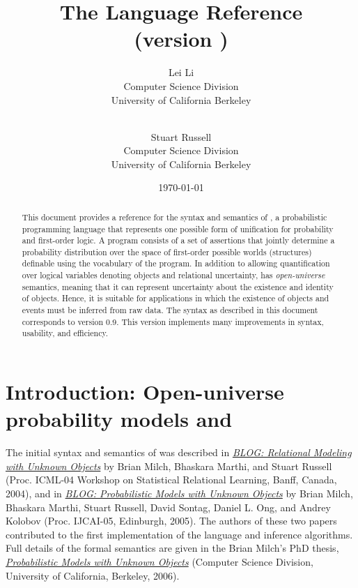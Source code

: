 \documentclass[12pt]{article}
\title{The \bl Language Reference  \\
{\large (\bl version \blogversion)}
}
\author{Lei Li\\
              Computer Science Division\\
              University of California Berkeley\\
               \email{leili@cs.berkeley.edu}\\
\and
               Stuart Russell\\
              Computer Science Division\\
              University of California Berkeley\\
               \email{russell@cs.berkeley.edu}
               }
\date{\today}
\newcommand{\blogversion}{0.9\xspace}
\begin{document}
\maketitle


\begin{abstract}
This document provides a reference for the syntax and semantics of \bl, a probabilistic programming language
that represents one possible form of unification for probability and first-order logic.
A \bl program consists of a set of assertions that jointly determine a probability distribution
over the space of first-order possible worlds (structures) definable using the vocabulary of
the program. In addition to allowing quantification over logical variables denoting objects and relational uncertainty,
\bl has {\em open-universe} semantics, meaning that it can represent uncertainty about the existence and
identity of objects. Hence, it is suitable for applications in which the existence of objects and events must be inferred from raw data.
The syntax as described in this document corresponds to \bl version \blogversion. This version implements many
improvements in syntax, usability, and efficiency.
\end{abstract}

\clearpage

\tableofcontents

\clearpage

\section{Introduction: Open-universe probability models and \bl}\label{intro-section}

The initial syntax and semantics of \bl was described in 
\href{http://www.cs.berkeley.edu/~russell/papers/srl04-blog.pdf}{{\it BLOG: Relational Modeling with Unknown Objects}}
by Brian Milch, Bhaskara Marthi, and Stuart Russell (Proc. ICML-04 Workshop on Statistical Relational Learning, Banff, Canada, 2004),
and in 
\href{http://www.cs.berkeley.edu/~russell/papers/ijcai05-blog.pdf}{{\it BLOG: Probabilistic Models with Unknown Objects}}
by Brian Milch, Bhaskara Marthi, Stuart Russell, David Sontag, Daniel L. Ong, and Andrey Kolobov (Proc. IJCAI-05, Edinburgh, 2005).
The authors of these two papers contributed to the first implementation of the \bl language and inference algorithms.
Full details of the formal semantics are given in the Brian Milch's PhD thesis,
\href{https://sites.google.com/site/bmilch/papers/milch_thesis.pdf}{{\it Probabilistic Models with Unknown Objects}} (Computer Science Division, University of California, Berkeley, 2006).
\end{document}
